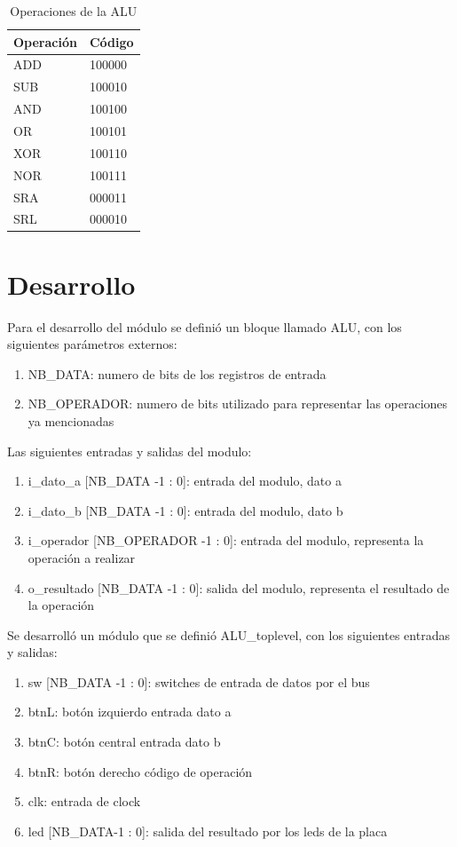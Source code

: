 \documentclass[a4paper]{article}
\begin{document}
\begin{table}[h]
\centering
\begin{tabular}{@{}ll@{}}
\toprule
Operación & Código \\ \midrule
ADD       & 100000 \\
SUB       & 100010 \\
AND       & 100100 \\
OR        & 100101 \\
XOR       & 100110 \\
NOR       & 100111 \\ 
SRA       & 000011 \\
SRL       & 000010 \\ \bottomrule
\end{tabular}
\caption{Operaciones de la ALU}
\label{operaciones}
\end{table}

\section{Desarrollo}

Para el desarrollo del módulo se definió un bloque llamado ALU, con los siguientes parámetros externos:
\begin{enumerate}
    \item NB\_DATA: numero de bits de los registros de entrada
    \item NB\_OPERADOR: numero de bits utilizado para representar las operaciones ya mencionadas
\end{enumerate}
Las siguientes entradas y salidas del modulo:
\begin{enumerate}
    \item i\_dato\_a [NB\_DATA -1 : 0]: entrada del modulo, dato a
    \item i\_dato\_b [NB\_DATA -1 : 0]: entrada del modulo, dato b
    \item i\_operador [NB\_OPERADOR -1 : 0]: entrada del modulo, representa la operación a realizar
    \item o\_resultado [NB\_DATA -1 : 0]: salida del modulo, representa el resultado de la operación
\end{enumerate}
Se desarrolló un módulo que se definió ALU\_toplevel, con los siguientes entradas y salidas:
\begin{enumerate}
    \item sw [NB\_DATA -1 : 0]: switches de entrada de datos por el bus
    \item btnL: botón izquierdo entrada dato a
    \item btnC: botón central entrada dato b
    \item btnR: botón derecho código de operación
    \item clk: entrada de clock
    \item led [NB\_DATA-1 : 0]: salida del resultado por los leds de la placa
\end{enumerate}
\end{document}
